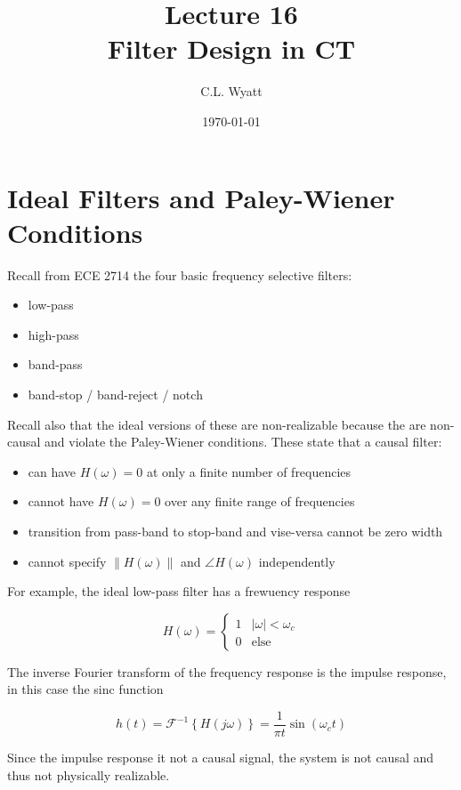 \documentclass{article}
\begin{document}
\title{Lecture 16\\Filter Design in CT}
\author{C.L. Wyatt}
\date{\today}
\maketitle

\section{Ideal Filters and Paley-Wiener Conditions}

Recall from ECE 2714 the four basic frequency selective filters:

\begin{itemize}
\item low-pass
\item high-pass
\item band-pass
\item band-stop / band-reject / notch
\end{itemize}

Recall also that the ideal versions of these are non-realizable because the are non-causal and violate the Paley-Wiener conditions. These state that a causal filter:

\begin{itemize}
\item can have $H(\omega) = 0$ at only a finite number of frequencies
\item cannot have $H(\omega) = 0$ over any finite range of frequencies
\item transition from pass-band to stop-band and vise-versa cannot be zero width
\item cannot specify $\|H(\omega)\|$ and $\angle H(\omega)$ independently
\end{itemize}

For example, the ideal low-pass filter has a frewuency response

\[
H(\omega) = \left\{ \begin{array}{cc}
  1 & |\omega| < \omega_c\\
  0 & \text{else}
\end{array}
\right.
\]

The inverse Fourier transform of the frequency response is the impulse response, in this case the sinc function

\[
h(t) = \mathcal{F}^{-1}\left\{H(j\omega)\right\} = \frac{1}{\pi t}\sin(\omega_c t)
\]

Since the impulse response it not a causal signal, the system is not causal and thus not physically realizable.
\end{document}
